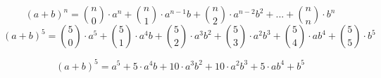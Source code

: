 \documentclass{article}
\begin{document}
\[
 (a+b)^n=\binom{n}{0} \cdot  a^n  + \binom{n}{1} \cdot  a^{n-1} b + \binom{n}{2} \cdot  a^{n-2} b^2  +...+ \binom{n}{n} \cdot   b^n  
 \]
 \[
 (a+b)^5=\binom{5}{0} \cdot  a^5  + \binom{5}{1} \cdot  a^4 b + \binom{5}{2} \cdot  a^3 b^2  +  \binom{5}{3} \cdot a^2 b^3 + \binom{5}{4} \cdot ab^4 + \binom{5}{5} \cdot   b^5 
\]

\[
 (a+b)^5= a^5  + 5\cdot  a^4 b + 10 \cdot  a^3 b^2  + 10 \cdot a^2 b^3 +5 \cdot ab^4 +   b^5 
\]
\end{document}
